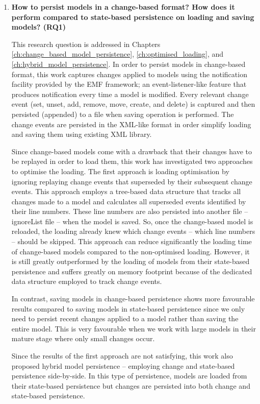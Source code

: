 \begin{enumerate} 
  \item \textbf{How to persist models in a change-based format? How does it perform compared to state-based persistence on loading and saving models? (RQ1)} 
  
  This research question is addressed in Chapters \ref{ch:change_based_model_persistence}, \ref{ch:optimised_loading}, and \ref{ch:hybrid_model_persistence}. In order to persist models in change-based format, this work captures changes applied to models using the notification facility provided by the EMF framework; an event-listener-like feature that produces notification every time a model is modified. Every relevant change event (set, unset, add, remove, move, create, and delete) is captured and then persisted (appended) to a file when saving operation is performed. The change events are persisted in the XML-like format in order simplify loading and saving them using existing XML library. 
  
  Since change-based models come with a drawback that their changes have to be replayed in order to load them, this work has investigated two approaches to optimise the loading. The first approach is loading optimisation by ignoring replaying change events that superseded by their subsequent change events. This approach employs a tree-based data structure that tracks all changes made to a model and calculates all superseded events identified by their line numbers. These line numbers are also persisted into another file -- \textsf{ignoreList} file -- when the model is saved. So, once the change-based model is reloaded, the loading already knew which change events -- which line numbers -- should be skipped. This approach can reduce significantly the loading time of change-based models compared to the non-optimised loading. However, it is still greatly outperformed by the loading of models from their state-based persistence and suffers greatly on memory footprint because of the dedicated data structure employed to track change events. 
  
  In contrast, saving models in change-based persistence shows more favourable results compared to saving models in state-based persistence since we only need to persist recent changes applied to a model rather than saving the entire model. This is very favourable when we work with large models in their mature stage where only small changes occur. 
  
  Since the results of the first approach are not satisfying, this work also proposed hybrid model persistence -- employing change and state-based persistence side-by-side. In this type of persistence, models are loaded from their state-based persistence but changes are persisted into both change and state-based persistence.  
  

\end{enumerate}
